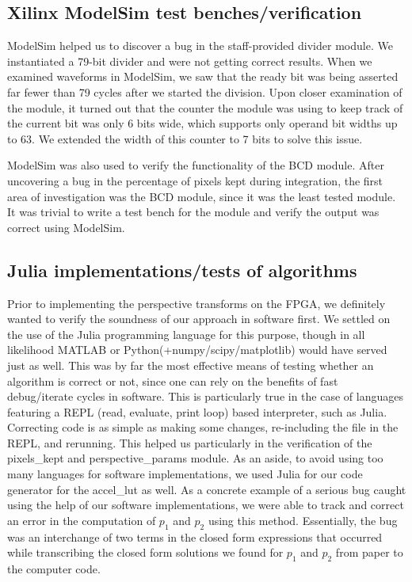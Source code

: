 \documentclass{article}
\begin{document}
\subsection{Xilinx ModelSim test benches/verification}
ModelSim helped us to discover a bug in the staff-provided divider module.
We instantiated a 79-bit divider and were not getting correct results.
When we examined waveforms in ModelSim, we saw that the ready bit was being asserted far fewer than 79 cycles after we started the division.
Upon closer examination of the module, it turned out that the counter the module was using to keep track of the current bit was only 6 bits wide,
which supports only operand bit widths up to 63.
We extended the width of this counter to 7 bits to solve this issue.

ModelSim was also used to verify the functionality of the BCD module.
After uncovering a bug in the percentage of pixels kept during integration, the first area of investigation was the BCD module, since it was the least tested module.
It was trivial to write a test bench for the module and verify the output was correct using ModelSim.

\subsection{Julia implementations/tests of algorithms}
Prior to implementing the perspective transforms on the FPGA,
we definitely wanted to verify the soundness of our approach in software first.
We settled on the use of the Julia programming language for this purpose,
though in all likelihood MATLAB or Python(+numpy/scipy/matplotlib) would have served just as well.
This was by far the most effective means of testing whether an algorithm is correct or not,
since one can rely on the benefits of fast debug/iterate cycles in software.
This is particularly true in the case of languages featuring a REPL (read, evaluate, print loop) based interpreter, such as Julia.
Correcting code is as simple as making some changes, re-including the file in the REPL, and rerunning.
This helped us particularly in the verification of the pixels\_kept and perspective\_params module.
As an aside, to avoid using too many languages for software implementations,
we used Julia for our code generator for the accel\_lut as well.
As a concrete example of a serious bug caught using the help of our software implementations,
we were able to track and correct an error in the computation of $p_1$ and $p_2$ using this method.
Essentially, the bug was an interchange of two terms in the closed form expressions that occurred
while transcribing the closed form solutions we found for $p_1$ and $p_2$ from paper to the computer code.
\end{document}
